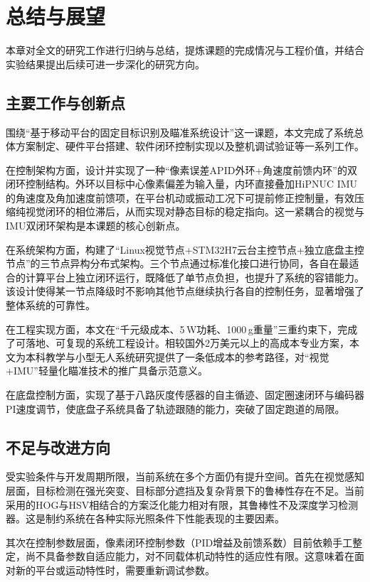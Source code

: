 \chapter{总结与展望}

本章对全文的研究工作进行归纳与总结，提炼课题的完成情况与工程价值，并结合实验结果提出后续可进一步深化的研究方向。

\section{主要工作与创新点}

围绕``基于移动平台的固定目标识别及瞄准系统设计''这一课题，本文完成了系统总体方案制定、硬件平台搭建、软件闭环控制实现以及整机调试验证等一系列工作。

在控制架构方面，设计并实现了一种``像素误差APID外环+角速度前馈内环''的双闭环控制结构。外环以目标中心像素偏差为输入量，内环直接叠加HiPNUC IMU的角速度及角加速度前馈项，在平台机动或振动工况下可提前修正控制量，有效压缩纯视觉闭环的相位滞后，从而实现对静态目标的稳定指向。这一紧耦合的视觉与IMU双闭环架构是本课题的核心创新点。

在系统架构方面，构建了``Linux视觉节点+STM32H7云台主控节点+独立底盘主控节点''的三节点异构分布式架构。三个节点通过标准化接口进行协同，各自在最适合的计算平台上独立闭环运行，既降低了单节点负担，也提升了系统的容错能力。该设计使得某一节点降级时不影响其他节点继续执行各自的控制任务，显著增强了整体系统的可靠性。

在工程实现方面，本文在``千元级成本、5\,W功耗、1000\,g重量''三重约束下，完成了可落地、可复现的系统工程设计。相较国外2万美元以上的高成本专业方案，本文为本科教学与小型无人系统研究提供了一条低成本的参考路径，对``视觉+IMU''轻量化瞄准技术的推广具备示范意义。

在底盘控制方面，实现了基于八路灰度传感器的自主循迹、固定圈速闭环与编码器PI速度调节，使底盘子系统具备了轨迹跟随的能力，突破了固定跑道的局限。

\section{不足与改进方向}

受实验条件与开发周期所限，当前系统在多个方面仍有提升空间。首先在视觉感知层面，目标检测在强光突变、目标部分遮挡及复杂背景下的鲁棒性存在不足。当前采用的HOG与HSV相结合的方案泛化能力相对有限，其鲁棒性不及深度学习检测器。这是制约系统在各种实际光照条件下性能表现的主要因素。

其次在控制参数层面，像素闭环控制参数（PID增益及前馈系数）目前依赖手工整定，尚不具备参数自适应能力，对不同载体机动特性的适应性有限。这意味着在面对新的平台或运动特性时，需要重新调试参数。

